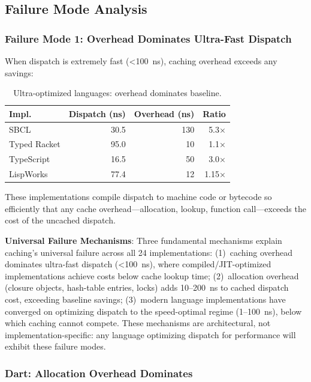 \documentclass[sigplan,final,acmsmall,review,screen]{acmart}
\begin{document}
\subsection{Failure Mode Analysis}

\subsubsection{Failure Mode 1: Overhead Dominates Ultra-Fast Dispatch}

When dispatch is extremely fast (<100~ns), caching overhead exceeds any savings:

\begin{table}[h!]
\centering
\small
\caption{Ultra-optimized languages: overhead dominates baseline.}
\label{tab:mode1}
\begin{tabular}{@{}lrrr@{}}
\toprule
\textbf{Impl.} & \textbf{Dispatch (ns)} & \textbf{Overhead (ns)} & \textbf{Ratio} \\
\midrule
SBCL & 30.5 & 130 & 5.3× \\
Typed Racket & 95.0 & 10 & 1.1× \\
TypeScript & 16.5 & 50 & 3.0× \\
LispWorks & 77.4 & 12 & 1.15× \\
\bottomrule
\end{tabular}
\end{table}

These implementations compile dispatch to machine code or bytecode so efficiently that any
cache overhead—allocation, lookup, function call—exceeds the cost of the uncached dispatch.

\textbf{Universal Failure Mechanisms}: Three fundamental mechanisms explain caching's universal failure across all 24 implementations:
(1)~caching overhead dominates ultra-fast dispatch (<100~ns), where compiled/JIT-optimized implementations achieve costs below cache lookup time;
(2)~allocation overhead (closure objects, hash-table entries, locks) adds 10--200~ns to cached dispatch cost, exceeding baseline savings;
(3)~modern language implementations have converged on optimizing dispatch to the speed-optimal regime (1--100~ns), below which caching cannot compete.
These mechanisms are architectural, not implementation-specific: any language optimizing dispatch for performance will exhibit these failure modes.

\subsubsection{Dart: Allocation Overhead Dominates}
\end{document}
